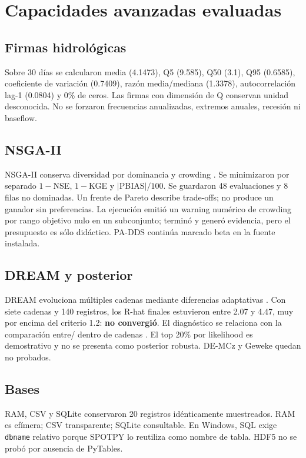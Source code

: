 \chapter{Capacidades avanzadas evaluadas}
\section{Firmas hidrológicas}
Sobre 30 días se calcularon media (4.1473), Q5 (9.585), Q50 (3.1), Q95 (0.6585), coeficiente de variación (0.7409), razón media/mediana (1.3378), autocorrelación lag-1 (0.0804) y 0\% de ceros. Las firmas con dimensión de Q conservan unidad desconocida. No se forzaron frecuencias anualizadas, extremos anuales, recesión ni baseflow.

\section{NSGA-II}
NSGA-II conserva diversidad por dominancia y crowding \citep{deb2002nsgaii}. Se minimizaron por separado $1-$NSE, $1-$KGE y $|$PBIAS$|/100$. Se guardaron 48 evaluaciones y 8 filas no dominadas. Un frente de Pareto describe trade-offs; no produce un ganador sin preferencias. La ejecución emitió un warning numérico de crowding por rango objetivo nulo en un subconjunto; terminó y generó evidencia, pero el presupuesto es sólo didáctico. PA-DDS continúa marcado beta en la fuente instalada.

\section{DREAM y posterior}
DREAM evoluciona múltiples cadenas mediante diferencias adaptativas \citep{vrugt2009dream}. Con siete cadenas y 140 registros, los R-hat finales estuvieron entre 2.07 y 4.47, muy por encima del criterio 1.2: \textbf{no convergió}. El diagnóstico se relaciona con la comparación entre/ dentro de cadenas \citep{gelman1992diagnostic}. El top 20\% por likelihood es demostrativo y no se presenta como posterior robusta. DE-MCz y Geweke quedan no probados.

\section{Bases}
RAM, CSV y SQLite conservaron 20 registros idénticamente muestreados. RAM es efímera; CSV transparente; SQLite consultable. En Windows, SQL exige \texttt{dbname} relativo porque SPOTPY lo reutiliza como nombre de tabla. HDF5 no se probó por ausencia de PyTables.

